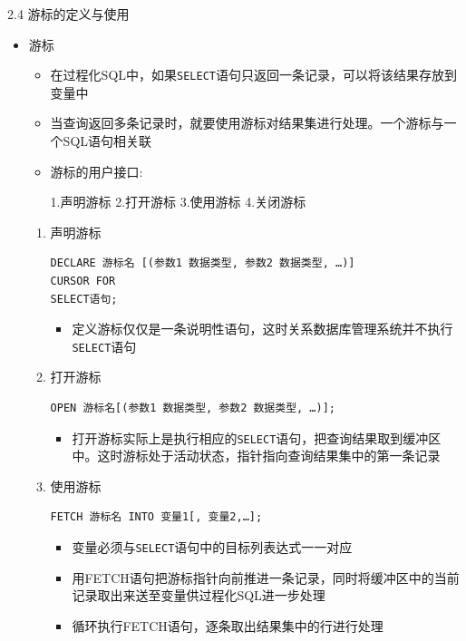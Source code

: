 \begin{frame}{2.4 游标的定义与使用}
\begin{itemize}
    \item 游标
    \begin{itemize}
        \item 在过程化SQL中，如果\lstinline{SELECT}语句只返回一条记录，可以将该结果存放到变量中
        \item 当查询返回多条记录时，就要使用游标对结果集进行处理。一个游标与一个SQL语句相关联
        \item 游标的用户接口: 
        
        1.声明游标 2.打开游标 3.使用游标 4.关闭游标
    \end{itemize}    
        \framebreak
    \begin{enumerate}
        \item 声明游标
\begin{block}{}
\begin{lstlisting}
DECLARE 游标名 [(参数1 数据类型, 参数2 数据类型, …)] 
CURSOR FOR 
SELECT语句;
\end{lstlisting}
\end{block} 
        \begin{itemize}
            \item 定义游标仅仅是一条说明性语句，这时关系数据库管理系统并不执行\lstinline{SELECT}语句
        \end{itemize}
\framebreak
        
\item 打开游标
        
\begin{block}{}
\begin{lstlisting}
OPEN 游标名[(参数1 数据类型, 参数2 数据类型, …)];
\end{lstlisting}
\end{block} 
        \begin{itemize}
            \item 打开游标实际上是执行相应的\lstinline{SELECT}语句，把查询结果取到缓冲区中。这时游标处于活动状态，指针指向查询结果集中的第一条记录
        \end{itemize}
        \framebreak
\item 使用游标

\begin{block}{}
\begin{lstlisting}
FETCH 游标名 INTO 变量1[, 变量2,…];
\end{lstlisting}
\end{block} 
\begin{itemize}
    \item 变量必须与\lstinline{SELECT}语句中的目标列表达式一一对应
    \item 用FETCH语句把游标指针向前推进一条记录，同时将缓冲区中的当前记录取出来送至变量供过程化SQL进一步处理
    \item 循环执行FETCH语句，逐条取出结果集中的行进行处理
\end{itemize}


\end{enumerate}
\end{itemize}
\end{frame}
